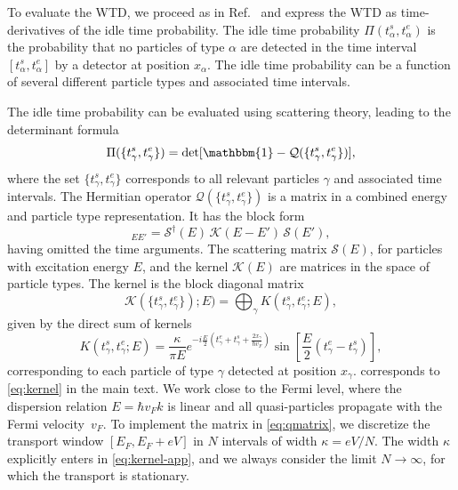 \documentclass[aps,prl,amsmath,twocolumn,floatfix,superscriptaddress,longbibliography,footinbib]{revtex4-1}
\begin{document}
To evaluate the WTD, we proceed as in Ref.~\cite{Dasenbrook2015} and express the WTD as time-derivatives of the idle time probability. The idle time probability $\Pi(t^s_\alpha,t^{e}_\alpha)$ is the probability that no particles of type $\alpha$ are detected in the time interval $[t^s_\alpha,t^{e}_\alpha]$ by a detector at position $x_\alpha$. The idle time probability can be a function of several different particle types and associated time intervals. 

The idle time probability can be evaluated using scattering theory, leading to the determinant formula~\cite{Dasenbrook2015}
\begin{equation}
	\Pi(\{t^{s}_\gamma, t^{e}_\gamma\})= \det[\mathbbm{1} - \mathcal{Q}(\{t^{s}_{\gamma}, t^{e}_{\gamma} \})] ,
	\label{eq:ITP}
\end{equation}
where the set $\{t^{s}_\gamma, t^{e}_\gamma\}$ corresponds to all relevant particles $\gamma$ and associated time intervals. The Hermitian operator $\mathcal{Q}(\{t^{s}_\gamma, t^{e}_\gamma\})$ is a matrix in a combined energy and particle type representation. It has the block form
\begin{equation}
	[\mathcal{Q}]_{EE'} = \mathcal{S}^{\dagger}(E)\, \mathcal{K}(E-E')\,\mathcal{S}(E'),
	\label{eq:qmatrix}
\end{equation}
having omitted the time arguments. The scattering matrix $\mathcal{S}(E)$, for particles with excitation energy $E$, and the kernel $\mathcal{K}(E)$ are matrices in the space of particle types. The kernel is the block diagonal matrix
\begin{equation}
	\mathcal{K}(\{t^{s}_\gamma, t^{e}_\gamma\});E) =\bigoplus_{\gamma} K( t^{s}_\gamma, t^{e}_\gamma; E)\label{eq:K-kernels} ,
\end{equation}
given by the direct sum of kernels
\begin{equation}
	K(t^{s}_\gamma, t^{e}_\gamma; E)
	=\frac{\kappa}{\pi E} e^{-i \frac{E}{2} \left(t^{e}_\gamma+t^{s}_\gamma+\frac{2x_\gamma}{\hbar v_F}\right)}
	\sin \left[ \frac{E}{2}(t^{e}_\gamma-t^s_\gamma) \right],
	\label{eq:kernel-app}
\end{equation}
corresponding to each particle of type $\gamma$ detected at position $x_\gamma$.  corresponds to \cref{eq:kernel} in the main text. 
We work close to the Fermi level, where the dispersion relation $E\!=\!\hbar v_Fk$ is linear and all quasi-particles propagate with the Fermi velocity~$v_F$. To implement the matrix in \cref{eq:qmatrix}, we discretize the transport window $[E_F,E_F+eV]$ in $N$ intervals of width $\kappa\!=\!eV/N$. The width $\kappa$ explicitly enters in \cref{eq:kernel-app}, and we always consider the limit $N\!\rightarrow\!\infty$, for which the transport is stationary. 
\end{document}
